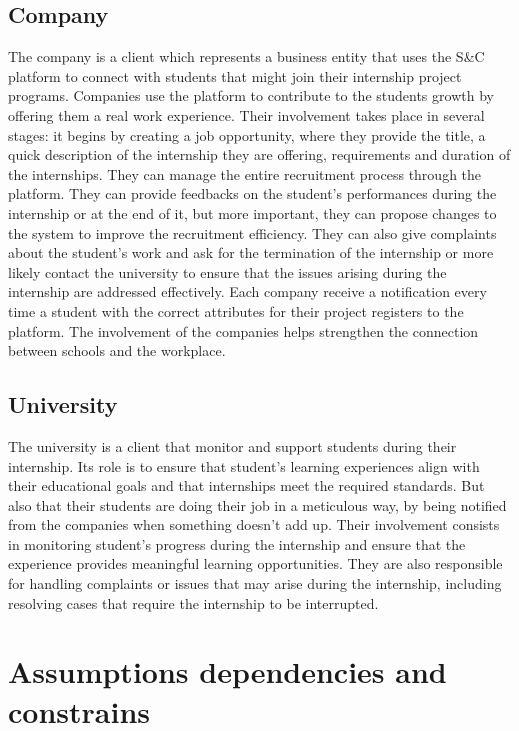 \subsection{Company}
The company is a client which represents a business entity that uses the S\&C platform to connect with students that might join their internship project programs. Companies use the platform to contribute to the students growth by offering them a real work experience. Their involvement takes place in several stages: it begins by creating a job opportunity, where they provide the title, a quick description of the internship they are offering, requirements and duration of the internships. They can manage the entire recruitment process through the platform. They can provide feedbacks on the student’s performances during the internship or at the end of it, but more important, they can propose changes to the system to improve the recruitment efficiency. They can also give complaints about the student’s work and ask for the termination of the internship or more likely contact the university to ensure that the issues arising during the internship are addressed effectively. Each company receive a notification every time a student with the correct attributes for their project registers to the platform. The involvement of the companies helps strengthen the connection between schools and the workplace.
\subsection{University}
The university is a client that monitor and support students during their internship. Its role is to ensure that student's learning experiences align with their educational goals and that internships meet the required standards. But also that their students are doing their job in a meticulous way, by being notified from the companies when something doesn’t add up. Their involvement consists in  monitoring student's progress during the internship and ensure that the experience provides meaningful learning opportunities. They are also responsible for handling complaints or issues that may arise during the internship, including resolving cases that require the internship to be interrupted.
\section{Assumptions dependencies and constrains}
